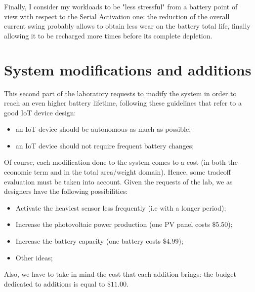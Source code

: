 \documentclass[a4paper]{article}
\begin{document}
        Finally, I consider my workloads to be "less stressful" from a battery point of view with respect to the Serial Activation one: the reduction of the overall current swing probably allows to obtain less wear on the battery total life, finally allowing it to be recharged more times before its complete depletion.

%                              
\section{System modifications and additions}
    This second part of the laboratory requests to modify the system in order to reach an even higher battery lifetime, following these guidelines that refer to a good IoT device design:
    \begin{itemize}
        \item an IoT device should be autonomous as much as possible;
        \item an IoT device should not require frequent battery changes;
    \end{itemize}

    Of course, each modification done to the system comes to a cost (in both the economic term and in the total area/weight domain). Hence, some tradeoff evaluation must be taken into account. Given the requests of the lab, we as designers have the following possibilities:
    \begin{itemize}
        \item Activate the heaviest sensor less frequently (i.e with a longer period);
        \item Increase the photovoltaic power production (one PV panel costs $\$5.50$);
        \item Increase the battery capacity (one battery costs $\$4.99$);
        \item Other ideas;
    \end{itemize}

    Also, we have to take in mind the cost that each addition brings: the budget dedicated to additions is equal to $\$11.00$.
    
\end{document}
